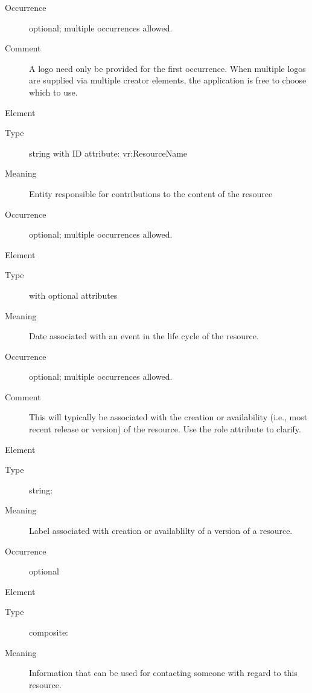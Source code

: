 \documentclass[11pt,a4paper]{ivoa}
\begin{document}
\begin{generated}
\begin{bigdescription}
\begin{description}
\item[Occurrence] optional; multiple occurrences allowed.
\item[Comment] 
                A logo need only be provided for the first occurrence.
                When multiple logos are supplied via multiple creator 
                elements, the application is free to choose which to
                use. 
             

\end{description}
\item[Element \xmlel{contributor}]
\begin{description}
\item[Type] string with ID attribute: vr:ResourceName
\item[Meaning] 
               Entity responsible for contributions to the content of
               the resource
             
\item[Occurrence] optional; multiple occurrences allowed.

\end{description}
\item[Element \xmlel{date}]
\begin{description}
\item[Type]  with optional attributes
\item[Meaning] 
               Date associated with an event in the life cycle of the
               resource.  
             
\item[Occurrence] optional; multiple occurrences allowed.
\item[Comment] 
               This will typically be associated with the creation or 
               availability (i.e., most recent release or version) of
               the resource.  Use the role attribute to clarify.
             

\end{description}
\item[Element \xmlel{version}]
\begin{description}
\item[Type] string: 
\item[Meaning] 
               Label associated with creation or availablilty of a version of 
               a resource.
             
\item[Occurrence] optional

\end{description}
\item[Element \xmlel{contact}]
\begin{description}
\item[Type] composite: 
\item[Meaning] 
               Information that can be used for contacting someone with
               regard to this resource.
             

\end{description}
\end{bigdescription}
\end{generated}
\end{document}
